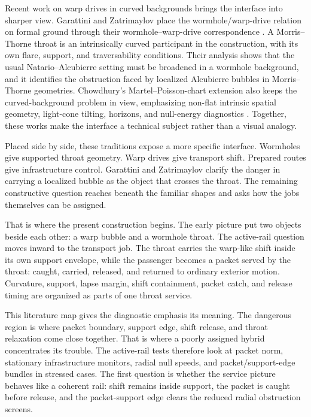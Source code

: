 \documentclass[11pt]{article}
\begin{document}
Recent work on warp drives in curved backgrounds brings the interface into sharper view. Garattini and Zatrimaylov place the wormhole/warp-drive relation on formal ground through their wormhole--warp-drive correspondence \citep{garattini_zatrimaylov_2024}. A Morris--Thorne throat is an intrinsically curved participant in the construction, with its own flare, support, and traversability conditions. Their analysis shows that the usual Natario--Alcubierre setting must be broadened in a wormhole background, and it identifies the obstruction faced by localized Alcubierre bubbles in Morris--Thorne geometries. Chowdhury's Martel--Poisson-chart extension also keeps the curved-background problem in view, emphasizing non-flat intrinsic spatial geometry, light-cone tilting, horizons, and null-energy diagnostics \citep{chowdhury_2025}. Together, these works make the interface a technical subject rather than a visual analogy.

Placed side by side, these traditions expose a more specific interface. Wormholes give supported throat geometry. Warp drives give transport shift. Prepared routes give infrastructure control. Garattini and Zatrimaylov clarify the danger in carrying a localized bubble as the object that crosses the throat. The remaining constructive question reaches beneath the familiar shapes and asks how the jobs themselves can be assigned.

That is where the present construction begins. The early picture put two objects beside each other: a warp bubble and a wormhole throat. The active-rail question moves inward to the transport job. The throat carries the warp-like shift inside its own support envelope, while the passenger becomes a packet served by the throat: caught, carried, released, and returned to ordinary exterior motion. Curvature, support, lapse margin, shift containment, packet catch, and release timing are organized as parts of one throat service.

This literature map gives the diagnostic emphasis its meaning. The dangerous region is where packet boundary, support edge, shift release, and throat relaxation come close together. That is where a poorly assigned hybrid concentrates its trouble. The active-rail tests therefore look at packet norm, stationary infrastructure monitors, radial null speeds, and packet/support-edge bundles in stressed cases. The first question is whether the service picture behaves like a coherent rail: shift remains inside support, the packet is caught before release, and the packet-support edge clears the reduced radial obstruction screens.
\end{document}
